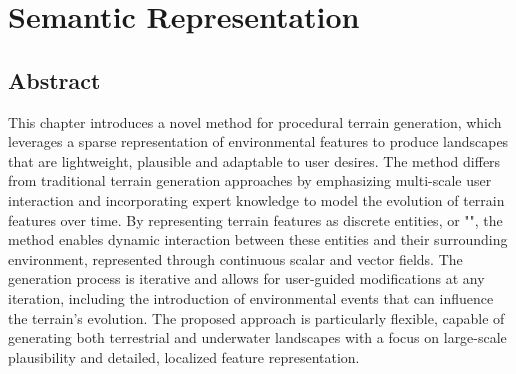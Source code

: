 \part{Semantic Representation}
\label{part:semantic-representation}

\chapter*{Abstract}
\label{chap:semantic-representation_abstract}
This chapter introduces a novel method for procedural terrain generation, which leverages a sparse representation of environmental features to produce landscapes that are lightweight, plausible and adaptable to user desires. The method differs from traditional terrain generation approaches by emphasizing multi-scale user interaction and incorporating expert knowledge to model the evolution of terrain features over time. By representing terrain features as discrete entities, or "", the method enables dynamic interaction between these entities and their surrounding environment, represented through continuous scalar and vector fields. The generation process is iterative and allows for user-guided modifications at any iteration, including the introduction of environmental events that can influence the terrain's evolution. The proposed approach is particularly flexible, capable of generating both terrestrial and underwater landscapes with a focus on large-scale plausibility and detailed, localized feature representation. 




